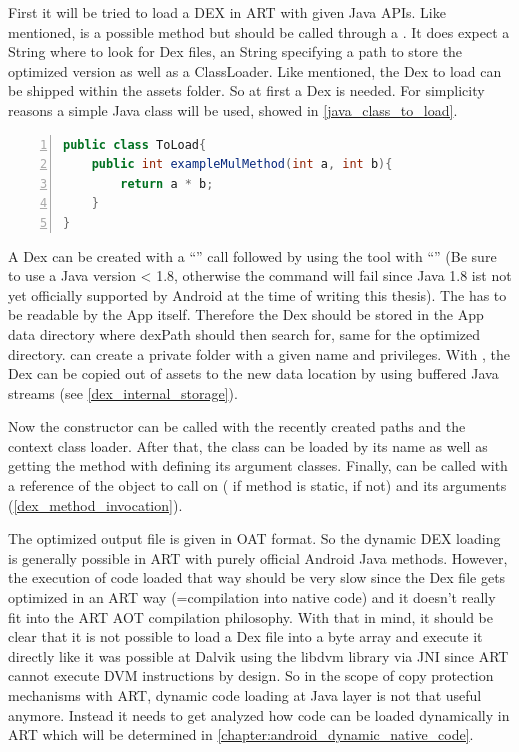 First it will be tried to load a DEX in ART with given Java APIs.
Like mentioned,  is a possible method but should be called
through a . It does expect a  String where to look for Dex files, an  String specifying a path to store the optimized version as well as a  ClassLoader.
Like mentioned, the Dex to load can be shipped within the assets folder.
So at first a Dex is needed. For simplicity reasons a simple Java class will be used, showed in \autoref{java_class_to_load}.
\begin{lstlisting}[language=Java, caption=Java Class to load, label=java_class_to_load, numbers=left]
public class ToLoad{
    public int exampleMulMethod(int a, int b){
        return a * b;
    }
}
\end{lstlisting}
A Dex can be created with a ``'' call followed by
using the  tool with ``'' (Be sure to use a Java version < 1.8, otherwise the 
command will fail since Java 1.8 ist not yet officially supported by Android at the time
of writing this thesis).
The  has to be readable by the App itself. Therefore
the Dex should be stored in the App data directory where dexPath should then
search for, same for the optimized directory.
 can create a private folder with a given name
and privileges. With , the Dex can be
copied out of assets to the new data location by using buffered Java streams (see \autoref{dex_internal_storage}).

Now the  constructor can be called with the recently
created paths and the context class loader. After that, the class can be loaded
by its name as well as getting the method with defining its argument classes.
Finally,  can be called with a reference of the object to call
on ( if method is static,  if not) and its
arguments (\autoref{dex_method_invocation}).

The optimized output file is given in OAT format.
So the dynamic DEX loading is generally possible in ART with purely official
Android Java methods. However, the execution of code loaded that way should
be very slow since the Dex file gets optimized in an ART way (=compilation
into native code) and it doesn't really fit into the ART AOT compilation
philosophy. With that in mind, it should be clear that it is not possible
to load a Dex file into a byte array and execute it directly like it was
possible at Dalvik using the libdvm library via JNI since ART cannot execute
DVM instructions by design. So in the scope of copy protection mechanisms
with ART, dynamic code loading at Java layer is not that useful anymore.
Instead it needs to get analyzed how code can be loaded dynamically in ART which
will be determined in \autoref{chapter:android_dynamic_native_code}.

